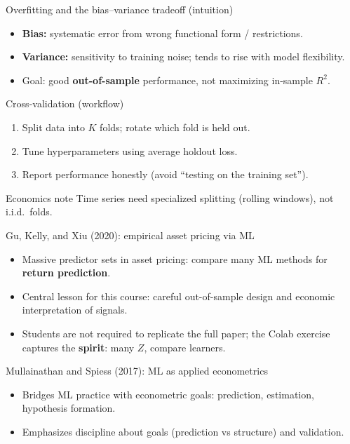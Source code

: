 \documentclass[aspectratio=169,11pt]{beamer}
\begin{document}
\begin{frame}{Overfitting and the bias--variance tradeoff (intuition)}
  \begin{itemize}
    \item \textbf{Bias:} systematic error from wrong functional form / restrictions.
    \item \textbf{Variance:} sensitivity to training noise; tends to rise with model flexibility.
    \item Goal: good \textbf{out-of-sample} performance, not maximizing in-sample \(R^2\).
  \end{itemize}
\end{frame}

\begin{frame}{Cross-validation (workflow)}
  \begin{enumerate}
    \item Split data into \(K\) folds; rotate which fold is held out.
    \item Tune hyperparameters using average holdout loss.
    \item Report performance honestly (avoid ``testing on the training set'').
  \end{enumerate}
  \vspace{0.3em}
  \begin{alertblock}{Economics note}
    Time series need specialized splitting (rolling windows), not i.i.d.\ folds.
  \end{alertblock}
\end{frame}

\begin{frame}{Gu, Kelly, and Xiu (2020): empirical asset pricing via ML}
  \begin{itemize}
    \item Massive predictor sets in asset pricing: compare many ML methods for \textbf{return prediction}.
    \item Central lesson for this course: careful out-of-sample design and economic interpretation of signals.
    \item Students are not required to replicate the full paper; the Colab exercise captures the \textbf{spirit}: many \(Z\), compare learners.
  \end{itemize}
\end{frame}

\begin{frame}{Mullainathan and Spiess (2017): ML as applied econometrics}
  \begin{itemize}
    \item Bridges ML practice with econometric goals: prediction, estimation, hypothesis formation.
    \item Emphasizes discipline about goals (prediction vs structure) and validation.
  \end{itemize}
\end{frame}
\end{document}

